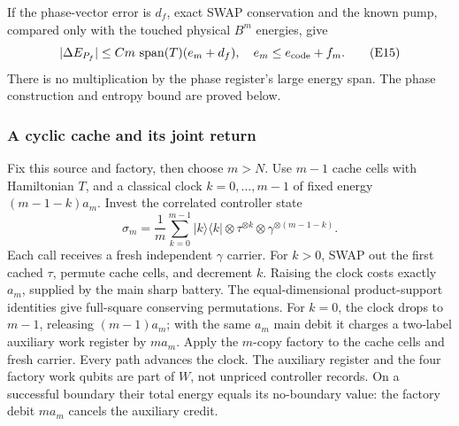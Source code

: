 If the phase-vector error is \(d_f\), exact SWAP conservation and
the known pump, compared only with the touched physical \(B^m\)
energies, give
\[
 |\Delta E_{P_f}|\le
 C m\,\operatorname{span}(T)(e_m+d_f),\quad
 e_m\le e_{\rm code}+f_m.                           \tag{E15}
\]
There is no multiplication by the phase register's large energy span.
The phase construction and entropy bound are proved below.

\subsubsection{A cyclic cache and its joint return}
Fix this source and factory, then choose \(m>N\).
Use \(m-1\) cache cells with Hamiltonian \(T\), and a classical clock
\(k=0,\ldots,m-1\) of fixed energy \((m-1-k)a_m\).
Invest the correlated controller state
\[
 \sigma_m=\frac1m\sum_{k=0}^{m-1}|k\rangle\langle k|
            \otimes\tau^{\otimes k}\otimes\gamma^{\otimes(m-1-k)}.
                                                               \tag{E16}
\]
Each call receives a fresh independent \(\gamma\) carrier.
For \(k>0\), SWAP out the first cached \(\tau\), permute cache cells,
and decrement \(k\). Raising the clock costs exactly \(a_m\), supplied
by the main sharp battery. The equal-dimensional product-support
identities give full-square conserving permutations.
For \(k=0\), the clock drops to \(m-1\), releasing \((m-1)a_m\);
with the same \(a_m\) main debit it charges a two-label auxiliary
work register by \(ma_m\). Apply the \(m\)-copy factory to the
cache cells and fresh carrier. Every path advances the clock.
The auxiliary register and the four factory work qubits are part of
\(W\), not unpriced controller records. On a successful boundary
their total energy equals its no-boundary value: the factory debit
\(ma_m\) cancels the auxiliary credit.

